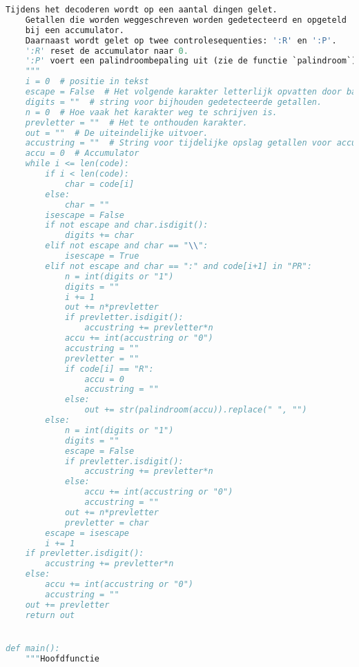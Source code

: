 \documentclass{article}
\begin{document}
\begin{lstlisting}[frame=single, language=python]
    Tijdens het decoderen wordt op een aantal dingen gelet.
    Getallen die worden weggeschreven worden gedetecteerd en opgeteld
    bij een accumulator.
    Daarnaast wordt gelet op twee controlesequenties: ':R' en ':P'.
    ':R' reset de accumulator naar 0.
    ':P' voert een palindroombepaling uit (zie de functie `palindroom`)
    """
    i = 0  # positie in tekst
    escape = False  # Het volgende karakter letterlijk opvatten door backslash.
    digits = ""  # string voor bijhouden gedetecteerde getallen.
    n = 0  # Hoe vaak het karakter weg te schrijven is.
    prevletter = ""  # Het te onthouden karakter.
    out = ""  # De uiteindelijke uitvoer.
    accustring = ""  # String voor tijdelijke opslag getallen voor accumulator.
    accu = 0  # Accumulator
    while i <= len(code):
        if i < len(code):
            char = code[i]
        else:
            char = ""
        isescape = False
        if not escape and char.isdigit():
            digits += char
        elif not escape and char == "\\":
            isescape = True
        elif not escape and char == ":" and code[i+1] in "PR":
            n = int(digits or "1")
            digits = ""
            i += 1
            out += n*prevletter
            if prevletter.isdigit():
                accustring += prevletter*n
            accu += int(accustring or "0")
            accustring = ""
            prevletter = ""
            if code[i] == "R":
                accu = 0
                accustring = ""
            else:
                out += str(palindroom(accu)).replace(" ", "")
        else:
            n = int(digits or "1")
            digits = ""
            escape = False
            if prevletter.isdigit():
                accustring += prevletter*n
            else:
                accu += int(accustring or "0")
                accustring = ""
            out += n*prevletter
            prevletter = char
        escape = isescape
        i += 1
    if prevletter.isdigit():
        accustring += prevletter*n
    else:
        accu += int(accustring or "0")
        accustring = ""
    out += prevletter
    return out


def main():
    """Hoofdfunctie


\end{lstlisting}
\end{document}
